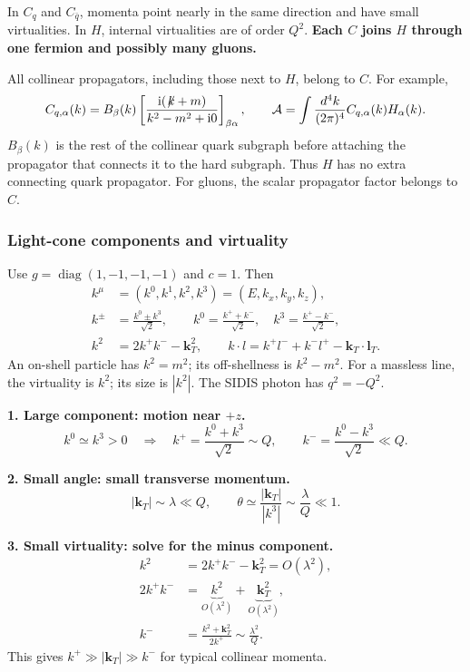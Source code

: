 \documentclass[14pt,a4paper]{extarticle}
\numberwithin{equation}{section}
\newcommand{\ii}{\mathrm i}
\newcommand{\slsh}[1]{\not\!#1}
\begin{document}
In $C_q$ and $C_{\bar q}$, momenta point nearly in the same direction
and have small virtualities. In $H$, internal virtualities are of order
$Q^2$. 
\textbf{Each $C$ joins $H$ through one fermion and possibly many gluons.}

All collinear propagators, including those next to $H$, belong to $C$.
For example,
\begin{equation}
 C_{q,\alpha}(k)=B_\beta(k)
 \left[\frac{\ii(\slsh k+m)}{k^2-m^2+\ii0}\right]_{\beta\alpha},
 \qquad
 \mathcal A=\int\frac{d^4k}{(2\pi)^4}C_{q,\alpha}(k)H_\alpha(k).
\end{equation}
$B_\beta(k)$ is the rest of the collinear quark subgraph before attaching the propagator that connects it to the hard subgraph.
Thus $H$ has no extra connecting quark propagator. 
For gluons, the scalar propagator factor belongs to $C$.

\subsubsection{Light-cone components and virtuality}
Use $g=\operatorname{diag}(1,-1,-1,-1)$ and $c=1$. Then
\begin{align}
 k^\mu&=(k^0,k^1,k^2,k^3)=(E,k_x,k_y,k_z),\\
 k^\pm&=\frac{k^0\pm k^3}{\sqrt2},\qquad
 k^0=\frac{k^++k^-}{\sqrt2},\quad k^3=\frac{k^+-k^-}{\sqrt2},\\
 k^2&=2k^+k^--\bm k_T^2,\qquad
 k\cdot l=k^+l^-+k^-l^+-\bm k_T\cdot\bm l_T.
\end{align}
An on-shell particle has $k^2=m^2$; its off-shellness is $k^2-m^2$.
For a massless line, the virtuality is $k^2$; its size is $|k^2|$.
The SIDIS photon has $q^2=-Q^2$.

\textbf{1. Large component: motion near $+z$.}
\begin{equation}
 k^0\simeq k^3>0
 \quad\Rightarrow\quad
 k^+=\frac{k^0+k^3}{\sqrt2}\sim Q,
 \qquad k^-=\frac{k^0-k^3}{\sqrt2}\ll Q.
\end{equation}

\textbf{2. Small angle: small transverse momentum.}
\begin{equation}
 |\bm k_T|\sim\lambda\ll Q,
 \qquad \theta\simeq\frac{|\bm k_T|}{|k^3|}
 \sim\frac{\lambda}{Q}\ll1.
\end{equation}

\textbf{3. Small virtuality: solve for the minus component.}
\begin{align}
 k^2&=2k^+k^--\bm k_T^2=O(\lambda^2),\\
 2k^+k^-&=\underbrace{k^2}_{O(\lambda^2)}
          +\underbrace{\bm k_T^2}_{O(\lambda^2)},\\
 k^-&=\frac{k^2+\bm k_T^2}{2k^+}
 \sim\frac{\lambda^2}{Q}.
\end{align}
This gives $k^+\gg|\bm k_T|\gg k^-$ for typical collinear momenta.
\end{document}
